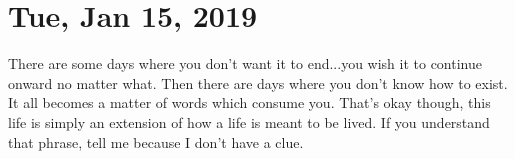 \section{Tue, Jan 15, 2019}

There are some days where you don't want it to end...you wish it to continue onward
no matter what. Then there are days where you don't know how to exist. It all becomes
a matter of words which consume you. That's okay though, this life is simply an
extension of how a life is meant to be lived. If you understand that phrase, tell me
because I don't have a clue.